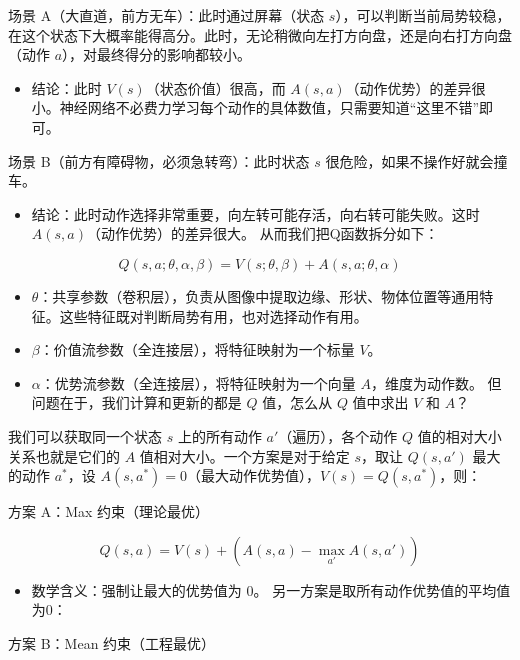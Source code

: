场景 A（大直道，前方无车）：此时通过屏幕（状态 \(s\)），可以判断当前局势较稳，在这个状态下大概率能得高分。此时，无论稍微向左打方向盘，还是向右打方向盘（动作 \(a\)），对最终得分的影响都较小。

\begin{itemize}
\tightlist
\item
  结论：此时 \(V(s)\)（状态价值）很高，而 \(A(s,a)\)（动作优势）的差异很小。神经网络不必费力学习每个动作的具体数值，只需要知道``这里不错''即可。
\end{itemize}

场景 B（前方有障碍物，必须急转弯）：此时状态 \(s\) 很危险，如果不操作好就会撞车。

\begin{itemize}
\tightlist
\item
  结论：此时动作选择非常重要，向左转可能存活，向右转可能失败。这时 \(A(s,a)\)（动作优势）的差异很大。
  从而我们把Q函数拆分如下：
\end{itemize}

\[
Q(s,a;\theta,\alpha,\beta)=V(s;\theta,\beta)+A(s,a;\theta,\alpha)
\]

\begin{itemize}
\tightlist
\item
  \(\theta\)：共享参数（卷积层），负责从图像中提取边缘、形状、物体位置等通用特征。这些特征既对判断局势有用，也对选择动作有用。
\item
  \(\beta\)：价值流参数（全连接层），将特征映射为一个标量 \(V\)。
\item
  \(\alpha\)：优势流参数（全连接层），将特征映射为一个向量 \(A\)，维度为动作数。
  但问题在于，我们计算和更新的都是 \(Q\) 值，怎么从 \(Q\) 值中求出 \(V\) 和 \(A\)？
\end{itemize}

我们可以获取同一个状态 \(s\) 上的所有动作 \(a'\)（遍历），各个动作 \(Q\) 值的相对大小关系也就是它们的 \(A\) 值相对大小。一个方案是对于给定 \(s\)，取让 \(Q(s,a')\) 最大的动作 \(a^*\)，设 \(A(s,a^*)=0\)（最大动作优势值），\(V(s)=Q(s,a^*)\)，则：

方案 A：Max 约束（理论最优）

\[
Q(s,a)=V(s)+(A(s,a)-\max_{a'}A(s,a'))
\]

\begin{itemize}
\tightlist
\item
  数学含义：强制让最大的优势值为 \(0\)。
  另一方案是取所有动作优势值的平均值为0：
\end{itemize}

方案 B：Mean 约束（工程最优）

